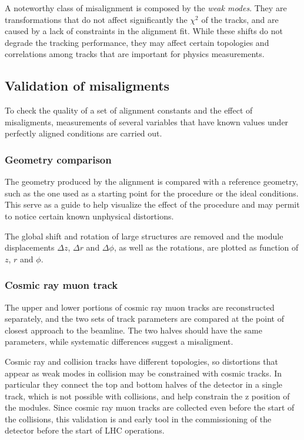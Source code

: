 A noteworthy class of misalignment is composed by the \textit{weak modes}.
They are transformations that do not affect significantly the $\chi^2$ of the tracks,
and are caused by a lack of constraints in the alignment fit.
While these shifts do not degrade the tracking performance,
they may affect certain topologies and correlations among tracks that are important for physics measurements.

\subsection{Validation of misaligments}
To check the quality of a set of alignment constants and the effect of misaligments,
measurements of several variables that have known values under perfectly aligned conditions are carried out.

\subsubsection{Geometry comparison} %
The geometry produced by the alignment is compared with a reference geometry,
such as the one used as a starting point for the procedure or the ideal conditions.
This serve as a guide to help visualize the effect of the procedure
and may permit to notice certain known unphysical distortions.

The global shift and rotation of large structures are removed and the module displacements
$\Delta z$, $\Delta r$ and $\Delta \phi$, as well as the rotations,
are plotted as function of $z$, $r$ and $\phi$.

\subsubsection{Cosmic ray muon track} %
The upper and lower portions of cosmic ray muon tracks are reconstructed separately,
and the two sets of track parameters are compared at the point of closest approach to the beamline.
The two halves should have the same parameters, while systematic differences suggest a misaligment.

Cosmic ray and collision tracks have different topologies, so distortions that appear as
weak modes in collision may be constrained with cosmic tracks.
In particular they connect the top and bottom halves of the detector in a single track,
which is not possible with collisions, and help constrain the z position of the modules.
Since cosmic ray muon tracks are collected even before the start of the collisions,
this validation is and early tool in the commissioning of the detector before the start of LHC operations.

